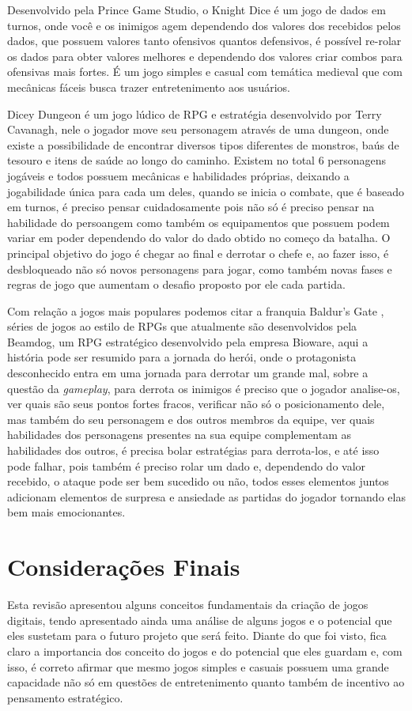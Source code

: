 \documentclass[12pt]{article}
\begin{document}
Desenvolvido pela Prince Game Studio, o Knight Dice \cite{knight} é um jogo de dados em turnos, onde você e os inimigos agem dependendo dos valores dos recebidos pelos dados, que possuem valores tanto ofensivos quantos defensivos, é possível re-rolar os dados para obter valores melhores e dependendo dos valores criar combos para ofensivas mais fortes. É um jogo simples e casual com temática medieval que com mecânicas fáceis busca trazer entretenimento aos usuários.

Dicey Dungeon \cite{dicey} é um jogo lúdico de RPG e estratégia desenvolvido por Terry Cavanagh, nele o jogador move seu personagem através de uma dungeon, onde existe a possibilidade de encontrar diversos tipos diferentes de monstros, baús de tesouro e itens de saúde ao longo do caminho. Existem no total 6 personagens jogáveis e todos possuem mecânicas e habilidades próprias, deixando a jogabilidade única para cada um deles, quando se inicia o combate, que é baseado em turnos, é preciso pensar cuidadosamente pois não só é preciso pensar na habilidade do persoangem como também os equipamentos que possuem podem variar em poder dependendo do valor do dado obtido no começo da batalha. O principal objetivo do jogo é chegar ao final e derrotar o chefe e, ao fazer isso, é desbloqueado não só novos personagens para jogar, como também novas fases e regras de jogo que aumentam o desafio proposto por ele cada partida.

Com relação a jogos mais populares podemos citar a franquia Baldur’s Gate \cite{baldur}, séries de jogos ao estilo de RPGs que atualmente são desenvolvidos pela  Beamdog, um RPG estratégico desenvolvido pela empresa Bioware, aqui a história pode ser resumido para a jornada do herói, onde o protagonista desconhecido entra em uma jornada para derrotar um grande mal, sobre a questão da \emph{gameplay}, para derrota os inimigos é preciso que o jogador analise-os, ver quais são seus pontos fortes fracos, verificar não só o posicionamento dele, mas também do seu personagem e dos outros membros da equipe, ver quais habilidades dos personagens presentes na sua equipe complementam as habilidades dos outros, é precisa bolar estratégias para derrota-los, e até isso pode falhar, pois também é preciso rolar um dado e, dependendo do valor recebido, o ataque pode ser bem sucedido ou não, todos esses elementos juntos adicionam elementos de surpresa e ansiedade as partidas do jogador tornando elas bem mais emocionantes. 

\section{Considerações Finais}
Esta revisão apresentou alguns conceitos fundamentais da criação de jogos digitais, tendo apresentado ainda uma análise de alguns jogos e o potencial que eles sustetam para o futuro projeto que será feito. Diante do que foi visto, fica claro a importancia dos conceito do jogos e do potencial que eles guardam e, com isso, é correto afirmar que mesmo jogos simples e casuais possuem uma grande capacidade não só em questões de entretenimento quanto também de incentivo ao pensamento estratégico.



\end{document}
